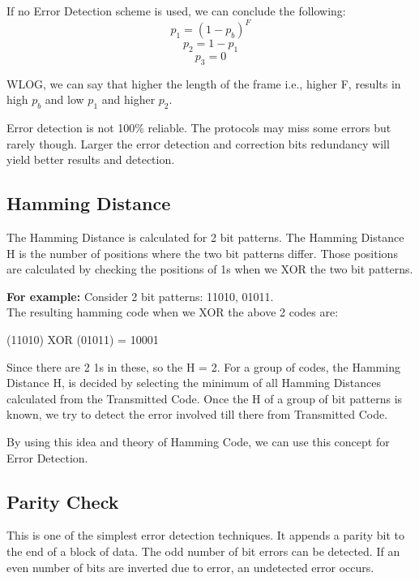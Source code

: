 \documentclass[12pt]{article}
\begin{document}
    If no Error Detection scheme is used, we can conclude the following:
    \begin{equation*}
        p_1 = (1 - p_b)^F
    \end{equation*}
    \begin{equation*}
        p_2 = 1 - p_1
    \end{equation*}
    \begin{equation*}
        p_3 = 0
    \end{equation*}

WLOG, we can say that higher the length of the frame i.e., higher F, results in high $p_b$ and low $p_1$ and higher $p_2$.

Error detection is not 100\% reliable. The protocols may miss some errors but rarely though. Larger the error detection and correction bits redundancy will yield better results and detection.


\subsection{Hamming Distance}

The Hamming Distance is calculated for 2 bit patterns. The Hamming Distance H is the number of positions where the two bit patterns differ. Those positions are calculated by checking the positions of 1s when we XOR the two bit patterns.

\textbf{For example:} Consider 2 bit patterns: 11010, 01011. \\
    The resulting hamming code when we XOR the above 2 codes are:
    \begin{center}
        (11010) XOR (01011) = 10001
    \end{center}
Since there are 2 1s in these, so the H = 2. For a group of codes, the Hamming Distance H, is decided by selecting the minimum of all Hamming Distances calculated from the Transmitted Code. Once the H of a group of bit patterns is known, we try to detect the error involved till there from Transmitted Code.

By using this idea and theory of Hamming Code, we can use this concept for Error Detection.


\subsection{Parity Check}
This is one of the simplest error detection techniques. It appends a parity bit to the end of a block of data.
The odd number of bit errors can be detected. If an even number of bits are inverted due to error, an undetected error occurs.
\end{document}
